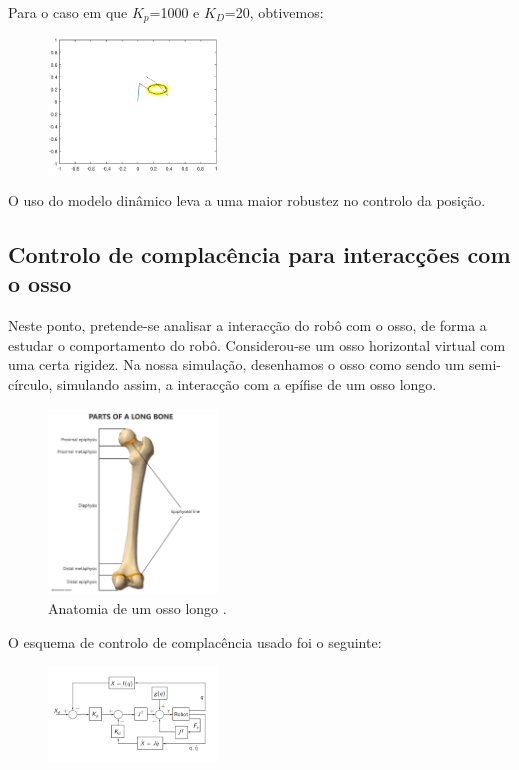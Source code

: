 \documentclass[a4paper,twocolumn,final,11pt]{article}
\begin{document}
Para o caso em que $K_p$=1000 e $K_D$=20, obtivemos:

\begin{figure}[H]
	\centering
	\includegraphics[width=0.4\textwidth]{7_versao1.eps}
	\caption{}
  \label{}
\end{figure}

O uso do modelo dinâmico leva a uma maior robustez no controlo da posição. 


\subsection{Controlo de complacência para interacções com o osso}

Neste ponto, pretende-se analisar a interacção do robô com o osso, de forma a estudar o comportamento do robô. Considerou-se um osso horizontal virtual com uma certa rigidez. Na nossa simulação, desenhamos o osso como sendo um semi-círculo, simulando assim, a interacção com a epífise de um osso longo.

\begin{figure}[H]
	\centering
	\includegraphics[width=0.4\textwidth]{parts-long-bone.png}
	\caption{Anatomia de um osso longo \cite{Sleewee}.}
  \label{}
\end{figure}
\linebreak
O esquema de controlo de complacência usado foi o seguinte:

\begin{figure}[H]
	\centering
	\includegraphics[width=0.4\textwidth]{Diapositivo1.PNG}
	\caption{\cite{Cortesão}}
  \label{}
\end{figure}
\end{document}
